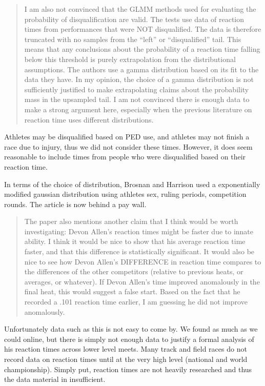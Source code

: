 \documentclass[12pt]{article}
\newenvironment{comment}%
{\begin{quotation}\noindent\small\it\color{darkblue}\ignorespaces%
}{\end{quotation}}
\begin{document}
\begin{comment}
I am also not convinced that the GLMM methods used for evaluating the
probability of disqualification are valid. The tests use data of reaction times
from performances that were NOT disqualified.  The data is therefore truncated
with no samples from the “left” or “disqualified” tail. This means that any
conclusions about the probability of a reaction time falling below this
threshold is purely extrapolation from the distributional assumptions. The
authors use a gamma distribution based on its fit to the data they have. In my
opinion, the choice of a gamma distribution is not sufficiently justified to
make extrapolating claims about the probability mass in the upsampled tail. I am
not convinced there is enough data to make a strong argument here, especially
when the previous literature on reaction time uses different distributions.
\end{comment}
Athletes may be disqualified based on PED use, and athletes may not finish a race
due to injury, thus we did not consider these times.  However, it does seem
reasonable to include times from people who were disqualified based on their
reaction time.

In terms of the choice of distribution, Brosnan and Harrison used a exponentially
modified gaussian distribution using athletes sex, ruling periods, competition
rounds. The article is now behind a pay wall.


\begin{comment}
The paper also mentions another claim that I think would be worth investigating:
Devon Allen’s reaction times might be faster due to innate ability. I think it
would be nice to show that his average reaction time faster, and that this
difference is statistically significant. It would also be nice to see how Devon
Allen’s DIFFERENCE in reaction time compares to the differences of the other
competitors (relative to previous heats, or averages, or whatever). If Devon
Allen’s time improved anomalously in the final heat, this would suggest a false
start. Based on the fact that he recorded a .101 reaction time earlier, I am
guessing he did not improve anomalously.  
\end{comment}

Unfortunately data such as this is not easy to come by.  We found as much as we
could online, but there is simply not enough data to justify a formal analysis
of his reaction times across lower level meets.  Many track and field races do
not record data on reaction times until at the very high level (national
and world championship).  Simply put, reaction times are not heavily researched
and thus the data material in insufficient.
\end{document}
